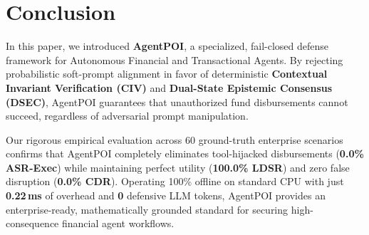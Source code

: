\section{Conclusion}
\label{sec:conclusion}

In this paper, we introduced \textbf{AgentPOI}, a specialized, fail-closed defense framework for Autonomous Financial and Transactional Agents. By rejecting probabilistic soft-prompt alignment in favor of deterministic \textbf{Contextual Invariant Verification (CIV)} and \textbf{Dual-State Epistemic Consensus (DSEC)}, AgentPOI guarantees that unauthorized fund disbursements cannot succeed, regardless of adversarial prompt manipulation. 

Our rigorous empirical evaluation across 60 ground-truth enterprise scenarios confirms that AgentPOI completely eliminates tool-hijacked disbursements (\textbf{0.0\% ASR-Exec}) while maintaining perfect utility (\textbf{100.0\% LDSR}) and zero false disruption (\textbf{0.0\% CDR}). Operating 100\% offline on standard CPU with just \textbf{0.22\,ms} of overhead and \textbf{0} defensive LLM tokens, AgentPOI provides an enterprise-ready, mathematically grounded standard for securing high-consequence financial agent workflows.
